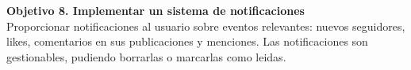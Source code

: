 \begin{description}
\item \textbf{Objetivo 8. Implementar un sistema de notificaciones} \\
Proporcionar notificaciones al usuario sobre eventos relevantes: nuevos seguidores, likes, comentarios en sus publicaciones y menciones. Las notificaciones son gestionables, pudiendo borrarlas o marcarlas como leidas.

\end{description}